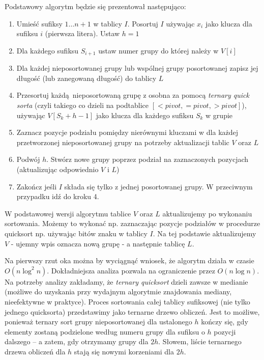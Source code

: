 \documentclass[12pt]{article}
\begin{document}
Podstawowy algorytm będzie się prezentował następująco:
\begin{enumerate}
    \item Umieść sufiksy $1 \ldots n+1$ w tablicy $I$. Posortuj $I$ używając $x_i$ jako klucza dla sufiksu $i$ (pierwsza litera). Ustaw $h=1$
    \item Dla każdego sufiksu $S_{i+1}$ ustaw numer grupy do której należy w $V[i]$
    \item Dla każdej nieposortowanej grupy lub wspólnej grupy posortowanej zapisz jej długość (lub zanegowaną długość) do tablicy $L$
    \item Przesortuj każdą nieposortowaną grupę z osobna za pomocą \textit{ternary quick sorta} (czyli takiego co dzieli na podtablice $[< \textit{pivot}, = \textit{pivot}, > \textit{pivot}]$), używając $V[S_k + h - 1]$ jako klucza dla każdego sufiksu $S_k$ w grupie
    \item Zaznacz pozycje podziału pomiędzy nierównymi kluczami w dla każdej przetworzonej nieposortowanej grupy na potrzeby aktualizacji tablic $V$ oraz $L$
    \item Podwój $h$. Stwórz nowe grupy poprzez podział na zaznaczonych pozycjach (aktualizując odpowiednio $V$ i $L$)
    \item Zakończ jeśli $I$ składa się tylko z jednej posortowanej grupy. W przeciwnym przypadku idź do kroku 4.
\end{enumerate}

W podstawowej wersji algorytmu tablice $V$ oraz $L$ aktualizujemy po wykonaniu sortowania. Możemy to wykonać np. zaznaczając pozycje podziałów w procedurze quicksort np. używając bitów znaku w tablicy $I$. Na tej podstawie aktualizujemy $V$ - ujemny wpis oznacza nową grupę - a następnie tablicę $L$.

Na pierwszy rzut oka można by wyciągnąć wniosek, że algorytm działa w czasie $O(n \log^2{n})$. Dokładniejsza analiza pozwala na ograniczenie przez $O(n \log{n})$. Na potrzeby analizy zakładamy, że \textit{ternary quicksort} dzieli zawsze w medianie (możliwe do uzyskania przy wydajnym algorytmie znajdowania mediany, nieefektywne w praktyce). Proces sortowania całej tablicy sufiksowej (nie tylko jednego quicksorta) przedstawimy jako ternarne drzewo obliczeń. Jest to możliwe, ponieważ ternary sort grupy nieposortowanej dla ustalonego $h$ kończy się, gdy elementy zostaną podzielone według numeru grupy dla sufiksu o $h$ pozycji dalszego -- a zatem, gdy otrzymamy grupy dla $2 h$. Słowem, liście ternarnego drzewa obliczeń dla $h$ stają się nowymi korzeniami dla $2 h$.
\end{document}
